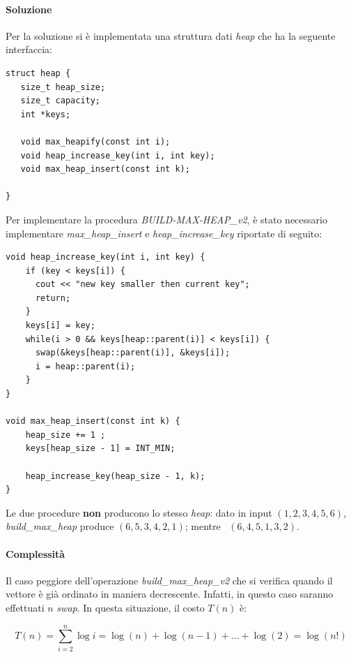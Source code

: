 \documentclass{article}
\begin{document}
\paragraph{Soluzione} Per la soluzione si è implementata una struttura dati \textit{heap} che ha la seguente interfaccia:

\begin{lstlisting}[caption={Interfaccia di un max heap},captionpos=b]
struct heap {
   size_t heap_size;
   size_t capacity;
   int *keys;

   void max_heapify(const int i);
   void heap_increase_key(int i, int key);
   void max_heap_insert(const int k);

}
\end{lstlisting}
Per implementare la procedura \textit{BUILD-MAX-HEAP\_v2}, è stato necessario implementare \textit{max\_heap\_insert} e \textit{heap\_increase\_key} riportate di seguito:

\begin{lstlisting}[caption={Implementazione procedure di inserimento in un max heap},captionpos=b]
void heap_increase_key(int i, int key) {
    if (key < keys[i]) {
      cout << "new key smaller then current key";
      return;
    }
    keys[i] = key;
    while(i > 0 && keys[heap::parent(i)] < keys[i]) {
      swap(&keys[heap::parent(i)], &keys[i]);
      i = heap::parent(i);
    }
}

void max_heap_insert(const int k) {
    heap_size += 1 ;
    keys[heap_size - 1] = INT_MIN;

    heap_increase_key(heap_size - 1, k);
}

\end{lstlisting}

Le due procedure \textbf{non} producono lo stesso \textit{heap}: dato in input $(1,2,3,4,5,6)$, \textit{build\_max\_heap} produce $(6,5,3,4,2,1)$; mentre \ $(6,4,5,1,3,2)$.

\paragraph{Complessità}
Il caso peggiore dell'operazione \textit{build\_max\_heap\_v2} che si verifica quando il vettore è già ordinato in maniera decrescente. Infatti, in questo caso saranno effettuati $n$ \textit{swap}. In questa situazione, il costo $T(n)$ è:

\begin{equation*}
    T(n) = \sum_{i=2}^n \log i = \log (n) + \log (n-1) + \dots + \log (2) = \log (n!)
\end{equation*}
\end{document}
